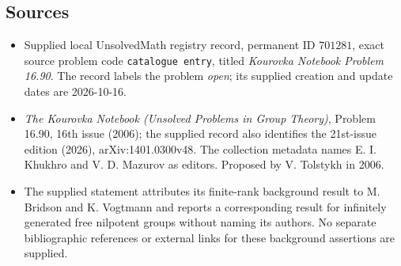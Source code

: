 \documentclass[11pt]{article}
\begin{document}
\subsection{Sources}
\begin{itemize}
\item Supplied local UnsolvedMath registry record, permanent ID \(701281\), exact source problem code \texttt{catalogue entry}, titled \emph{Kourovka Notebook Problem 16.90}. The record labels the problem \emph{open}; its supplied creation and update dates are 2026-10-16.
\item \emph{The Kourovka Notebook (Unsolved Problems in Group Theory)}, Problem 16.90, 16th issue (2006); the supplied record also identifies the 21st-issue edition (2026), arXiv:1401.0300v48. The collection metadata names E. I. Khukhro and V. D. Mazurov as editors. Proposed by V. Tolstykh in 2006.
\item The supplied statement attributes its finite-rank background result to M. Bridson and K. Vogtmann and reports a corresponding result for infinitely generated free nilpotent groups without naming its authors. No separate bibliographic references or external links for these background assertions are supplied.
\end{itemize}
\end{document}
